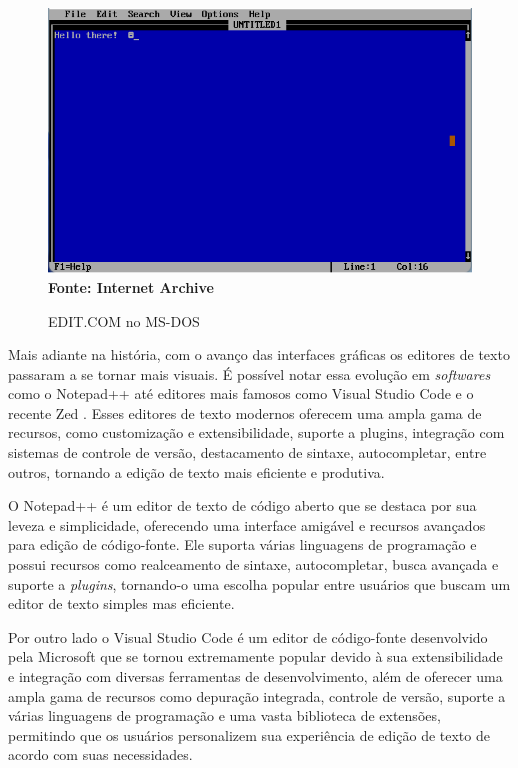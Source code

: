 \FloatBarrier
\begin{figure}[!htbp]
    \centering
    \caption{EDIT.COM no MS-DOS}
    \includegraphics[scale=0.8]{imagens/EDIT_MSDOS.png}
    \\\textbf{Fonte: Internet Archive} \label{fig:EDIT_MSDOS}
\end{figure}
\FloatBarrier

Mais adiante na história, com o avanço das interfaces gráficas os editores de
texto passaram a se tornar mais visuais. É possível notar essa evolução em \textit{softwares}
como o Notepad++ \cite{NotepadPlusPlus2025} até editores mais famosos como Visual
Studio Code \cite{VSCode2025} e o recente Zed \cite{ZedEditor2025}. Esses
editores de texto modernos oferecem uma ampla gama de recursos, como customização
e extensibilidade, suporte a plugins, integração com sistemas de controle de versão,
destacamento de sintaxe, autocompletar, entre outros, tornando a edição de texto
mais eficiente e produtiva.

O Notepad++ é um editor de texto de código aberto que se destaca por sua leveza e
simplicidade, oferecendo uma interface amigável e recursos avançados para edição
de código-fonte. Ele suporta várias linguagens de programação e possui recursos como
realceamento de sintaxe, autocompletar, busca avançada e suporte a \textit{plugins},
tornando-o uma escolha popular entre usuários que buscam um editor de texto
simples mas eficiente.

Por outro lado o Visual Studio Code é um editor de código-fonte desenvolvido
pela Microsoft que se tornou extremamente popular devido à sua extensibilidade e
integração com diversas ferramentas de desenvolvimento, além de oferecer uma ampla
gama de recursos como depuração integrada, controle de versão, suporte a várias linguagens
de programação e uma vasta biblioteca de extensões, permitindo que os usuários
personalizem sua experiência de edição de texto de acordo com suas necessidades.

